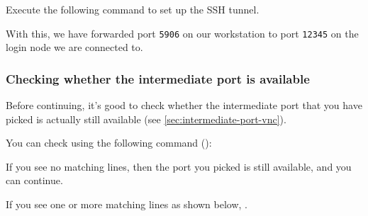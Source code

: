 \else

Execute the following command to set up the SSH tunnel.\\

\begin{prompt}
\end{prompt}


\fi

With this, we have forwarded port \lstinline|5906| on our workstation to port \lstinline|12345|
on the login node we are connected to.


\subsubsection{Checking whether the intermediate port is available}

Before continuing, it's good to check whether the intermediate port that you have picked
is actually still available (see \autoref{sec:intermediate-port-vnc}).

You can check using the following command ():

\begin{prompt}
\end{prompt}

If you see no matching lines, then the port you picked is still available, and you can continue.

If you see one or more matching lines as shown below, .

\begin{prompt}
\end{prompt}

